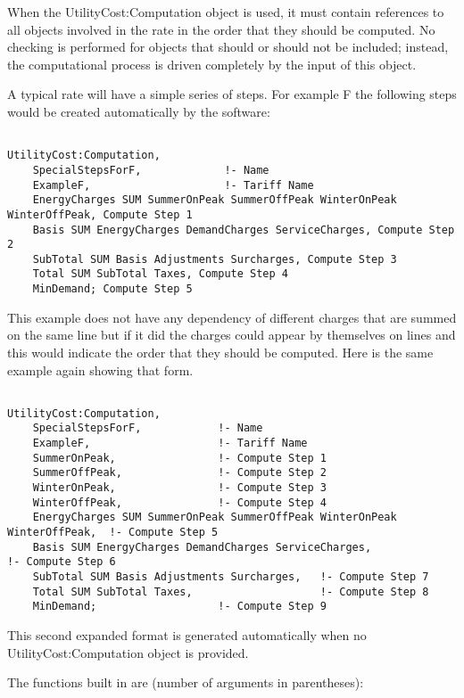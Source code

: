 When the UtilityCost:Computation object is used, it must contain references to all objects involved in the rate in the order that they should be computed. No checking is performed for objects that should or should not be included; instead, the computational process is driven completely by the input of this object.

A typical rate will have a simple series of steps. For example F the following steps would be created automatically by the software:

\begin{lstlisting}

UtilityCost:Computation,
    SpecialStepsForF,             !- Name
    ExampleF,                     !- Tariff Name
    EnergyCharges SUM SummerOnPeak SummerOffPeak WinterOnPeak WinterOffPeak, Compute Step 1
    Basis SUM EnergyCharges DemandCharges ServiceCharges, Compute Step 2
    SubTotal SUM Basis Adjustments Surcharges, Compute Step 3
    Total SUM SubTotal Taxes, Compute Step 4
    MinDemand; Compute Step 5
\end{lstlisting}

This example does not have any dependency of different charges that are summed on the same line but if it did the charges could appear by themselves on lines and this would indicate the order that they should be computed. Here is the same example again showing that form.

\begin{lstlisting}

UtilityCost:Computation,
    SpecialStepsForF,            !- Name
    ExampleF,                    !- Tariff Name
    SummerOnPeak,                !- Compute Step 1
    SummerOffPeak,               !- Compute Step 2
    WinterOnPeak,                !- Compute Step 3
    WinterOffPeak,               !- Compute Step 4
    EnergyCharges SUM SummerOnPeak SummerOffPeak WinterOnPeak WinterOffPeak,  !- Compute Step 5
    Basis SUM EnergyCharges DemandCharges ServiceCharges,                     !- Compute Step 6
    SubTotal SUM Basis Adjustments Surcharges,   !- Compute Step 7
    Total SUM SubTotal Taxes,                    !- Compute Step 8
    MinDemand;                   !- Compute Step 9
\end{lstlisting}

This second expanded format is generated automatically when no UtilityCost:Computation object is provided.

The functions built in are (number of arguments in parentheses):

